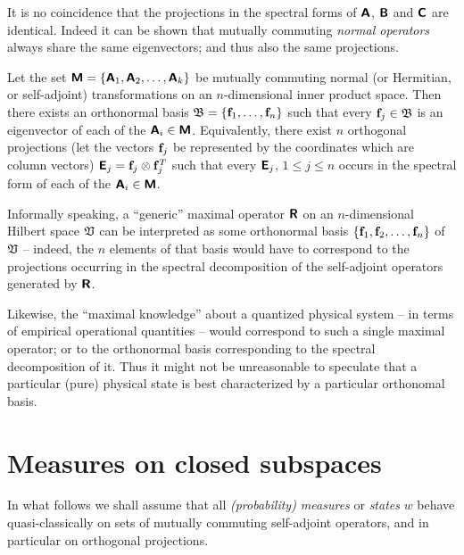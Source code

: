 It is no coincidence that the projections in the spectral forms of
$\textsf{\textbf{A}}$,
$\textsf{\textbf{B}}$  and
$\textsf{\textbf{C}}$ are identical.
Indeed it can be shown that mutually commuting {\em normal operators} always share the same eigenvectors; and thus also the same projections.

Let the set $\textsf{\textbf{M}}
=
\{
\textsf{\textbf{A}}_1,
\textsf{\textbf{A}}_2,
\ldots ,
\textsf{\textbf{A}}_k
\}
$
be mutually commuting  normal (or Hermitian, or self-adjoint) transformations on an $n$-dimensional inner product space.
Then there exists an orthonormal basis
${\frak B}= \{
{\bf f}_1,
\ldots ,
{\bf f}_n\}$
such that every ${\bf f}_j \in {\frak B}$  is an eigenvector  of each of the $\textsf{\textbf{A}}_i \in  \textsf{\textbf{M}}$.
Equivalently, there exist $n$ orthogonal projections  (let the vectors ${\bf f}_j$ be represented by the coordinates which are column vectors)
$\textsf{\textbf{E}}_j= {\bf f}_j\otimes {\bf f}_j^T$
such that every $\textsf{\textbf{E}}_j$, $1\le j\le n$ occurs in the spectral form of each of the $\textsf{\textbf{A}}_i \in  \textsf{\textbf{M}}$.


Informally speaking,
a ``generic'' maximal operator $\textsf{\textbf{R}}$ on an $n$-dimensional Hilbert space ${\frak V}$
can be interpreted as some orthonormal basis
$\{{\bf f}_1,{\bf f}_2,\ldots ,{\bf f}_n\}$ of ${\frak V}$
-- indeed, the $n$ elements of that basis would have to correspond to the projections occurring
in the spectral decomposition of the self-adjoint operators
generated by $\textsf{\textbf{R}}$.

{\color{Purple}
Likewise, the ``maximal knowledge'' about a quantized physical system -- in terms of empirical operational quantities --
would correspond to such a single maximal operator;
or to the orthonormal basis corresponding to the spectral decomposition of it.
Thus it might not be unreasonable to speculate that a particular (pure) physical state is best characterized by a particular orthonomal basis.
}


\section{Measures on closed subspaces}

In what follows we shall assume that all {\em (probability) measures}
or {\em states} $w$
behave quasi-classically on sets of mutually commuting self-adjoint operators,
and in particular on orthogonal projections.


